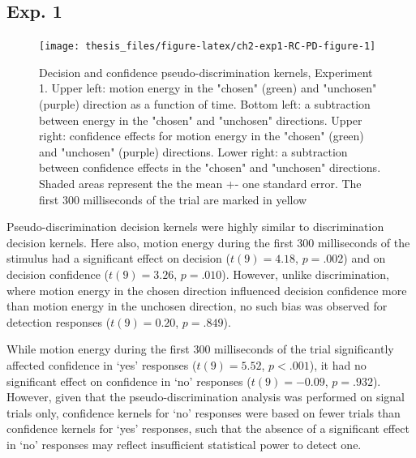 \documentclass[12pt,twoside]{reedthesis}
\begin{document}
\hypertarget{exp.-1}{%
\subsection{Exp. 1}\label{exp.-1}}
\begin{figure}
\texttt{[image: thesis\_files/figure-latex/ch2-exp1-RC-PD-figure-1]} \caption[Pseudo-discrimination kernels for detection signal trials.]{Decision and confidence pseudo-discrimination kernels, Experiment 1. Upper left: motion energy in the "chosen" (green) and "unchosen" (purple) direction as a function of time. Bottom left: a subtraction between energy in the "chosen" and "unchosen" directions. Upper right: confidence effects for motion energy in the "chosen" (green) and "unchosen" (purple) directions. Lower right: a subtraction between confidence effects in the "chosen" and "unchosen" directions. Shaded areas represent the the mean +- one standard error. The first 300 milliseconds of the trial are marked in yellow}\label{fig:ch2-exp1-RC-PD-figure}
\end{figure}
Pseudo-discrimination decision kernels were highly similar to discrimination decision kernels. Here also, motion energy during the first 300 milliseconds of the stimulus had a significant effect on decision (\(t(9) = 4.18\), \(p = .002\)) and on decision confidence (\(t(9) = 3.26\), \(p = .010\)). However, unlike discrimination, where motion energy in the chosen direction influenced decision confidence more than motion energy in the unchosen direction, no such bias was observed for detection responses (\(t(9) = 0.20\), \(p = .849\)).

While motion energy during the first 300 milliseconds of the trial significantly affected confidence in `yes' responses (\(t(9) = 5.52\), \(p < .001\)), it had no significant effect on confidence in `no' responses (\(t(9) = -0.09\), \(p = .932\)). However, given that the pseudo-discrimination analysis was performed on signal trials only, confidence kernels for `no' responses were based on fewer trials than confidence kernels for `yes' responses, such that the absence of a significant effect in `no' responses may reflect insufficient statistical power to detect one.
\end{document}
